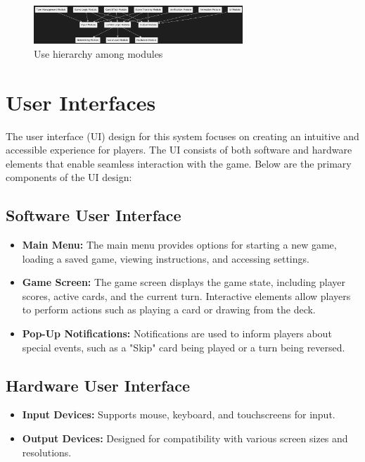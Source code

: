 \documentclass[12pt, titlepage]{article}
\begin{document}

\begin{figure}[H]
\centering
\includegraphics[width=0.7\textwidth]{output.png}
\caption{Use hierarchy among modules}
\label{FigUH}
\end{figure}



\section{User Interfaces}

The user interface (UI) design for this system focuses on creating an intuitive and accessible experience for players. The UI consists of both software and hardware elements that enable seamless interaction with the game. Below are the primary components of the UI design:

\subsection{Software User Interface}
\begin{itemize}
    \item \textbf{Main Menu:} The main menu provides options for starting a new game, loading a saved game, viewing instructions, and accessing settings.
    \item \textbf{Game Screen:} The game screen displays the game state, including player scores, active cards, and the current turn. Interactive elements allow players to perform actions such as playing a card or drawing from the deck.
    \item \textbf{Pop-Up Notifications:} Notifications are used to inform players about special events, such as a "Skip" card being played or a turn being reversed.
\end{itemize}

\subsection{Hardware User Interface}
\begin{itemize}
    \item \textbf{Input Devices:} Supports mouse, keyboard, and touchscreens for input.
    \item \textbf{Output Devices:} Designed for compatibility with various screen sizes and resolutions.
\end{itemize}
\end{document}
